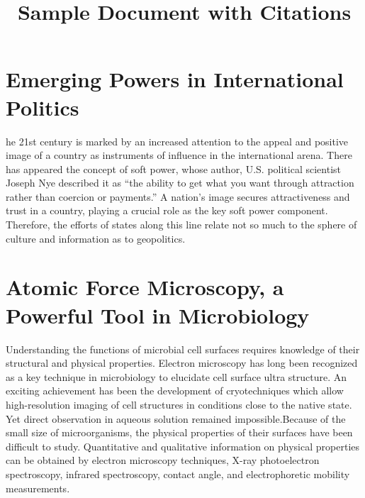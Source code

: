 \documentclass{article}
\begin{document}
	
	\title{Sample Document with Citations}
	\author{}
	\date{}
	\maketitle
	
	\section{Emerging Powers in International Politics}
	  he 21st century is marked by an increased attention to the appeal and positive image of a country as instruments of influence in the international arena\cite{bohomolov2012ghost}. There has appeared the concept of soft power, whose author, U.S\cite{sergunin2015understanding}. political scientist Joseph Nye described it as “the ability to get what you want through attraction rather than coercion or payments\cite{hill2006moscow}.” A nation’s image secures attractiveness and trust in a country, playing a crucial role as the key soft power component\cite{kiseleva2015russia}. Therefore, the efforts of states along this line relate not so much to the sphere of culture and information as to geopolitics\cite{kosachev2012spsecific}.
	
	
	\section{Atomic Force Microscopy, a Powerful Tool in Microbiology}
      Understanding the functions of microbial cell surfaces requires knowledge of their structural and physical properties\cite{dufrene2002atomic}. Electron microscopy has long been recognized as a key technique in microbiology to elucidate cell surface ultra structure\cite{engel1999atomic}. An exciting achievement has been the development of cryotechniques which allow high-resolution imaging of cell structures in conditions close to the native state\cite{franz2008atomic}. Yet direct observation in aqueous solution remained impossible.Because of the small size of microorganisms, the physical properties of their surfaces have been difficult to study\cite{marrese2017atomic}. Quantitative and qualitative information on physical properties can be obtained by electron microscopy techniques, X-ray photoelectron spectroscopy, infrared spectroscopy, contact angle, and electrophoretic mobility measurements\cite{altman2015noncontact}. 
	
	
	
	
\end{document}
